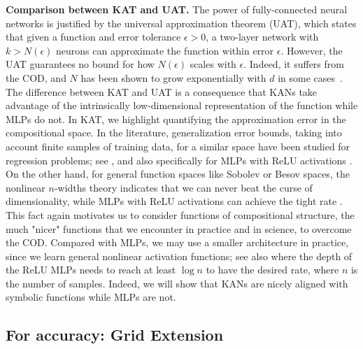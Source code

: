 \documentclass{article}
\numberwithin{equation}{section}
\numberwithin{figure}{section}
\begin{document}
{\bf Comparison between KAT and UAT.}
The power of fully-connected neural networks is justified by the universal approximation theorem (UAT), which states that given a function and error tolerance $\epsilon>0$, a two-layer network with $k>N(\epsilon)$ neurons can approximate the function within error $\epsilon$. However, the UAT guarantees no bound for how $N(\epsilon)$ scales with $\epsilon$. Indeed, it suffers from the COD, and $N$ has been shown to grow exponentially with $d$ in some cases~\cite{lin2017does}. The difference between KAT and UAT is a consequence that KANs take advantage of the intrinsically low-dimensional representation of the function while  MLPs do not. In KAT, we highlight quantifying the approximation error in the compositional space. In the literature, generalization error bounds, taking into account finite samples of training data, for a similar space have been studied for regression problems; see \cite{horowitz2007rate, kohler2021rate}, and also specifically for MLPs with ReLU activations \cite{schmidt2020nonparametric}. On the other hand, for general function spaces like Sobolev or Besov spaces, the nonlinear $n$-widths theory \cite{devore1989optimal,devore1993wavelet,siegel2024sharp} indicates that we can never beat the curse of dimensionality, while MLPs with ReLU activations can achieve the tight rate \cite{yarotsky2017error, bartlett2019nearly, siegel2023optimal}.  This fact again motivates us to consider functions of compositional structure, the much "nicer" functions that we encounter in practice and in science, to overcome the COD. Compared with MLPs, we may use a smaller architecture in practice, since we learn general nonlinear activation functions; see also \cite{schmidt2020nonparametric} where the depth of the ReLU MLPs needs to reach at least $\log n$ to have the desired rate, where $n$ is the number of samples. Indeed, we will show that KANs are nicely aligned with symbolic functions while MLPs are not.





\subsection{For accuracy: Grid Extension}\label{subsec:kan_grid_extension}
\end{document}
